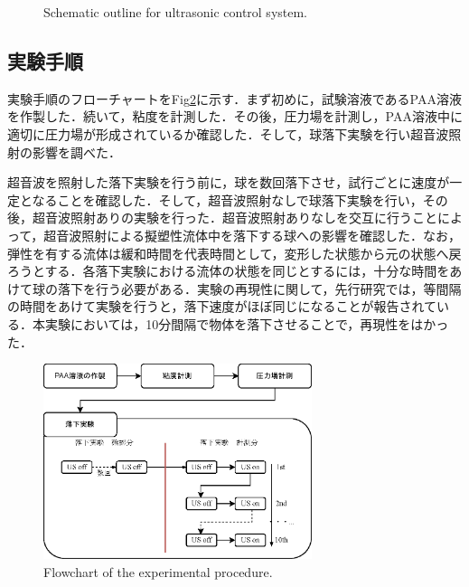 \begin{figure}[h]
    \centering
    \caption{Schematic outline for ultrasonic control system.}
    \label{fig:connect-with-signal}
\end{figure}

\newpage

\subsection{実験手順}

実験手順のフローチャートをFig\ref{fig:exp-methods}に示す．まず初めに，試験溶液であるPAA溶液を作製した．続いて，粘度を計測した．その後，圧力場を計測し，PAA溶液中に適切に圧力場が形成されているか確認した．そして，球落下実験を行い超音波照射の影響を調べた．

超音波を照射した落下実験を行う前に，球を数回落下させ，試行ごとに速度が一定となることを確認した．そして，超音波照射なしで球落下実験を行い，その後，超音波照射ありの実験を行った．超音波照射ありなしを交互に行うことによって，超音波照射による擬塑性流体中を落下する球への影響を確認した．なお，弾性を有する流体は緩和時間を代表時間として，変形した状態から元の状態へ戻ろうとする．各落下実験における流体の状態を同じとするには，十分な時間をあけて球の落下を行う必要がある．実験の再現性に関して，先行研究\cite{ref:8-5}では，等間隔の時間をあけて実験を行うと，落下速度がほぼ同じになることが報告されている．本実験においては，10分間隔で物体を落下させることで，再現性をはかった．

\begin{figure}[ht]
    \centering
    \includegraphics[width=0.7\textwidth]{2-Methods/exp-methods.eps}
    \caption{Flowchart of the experimental procedure.}
    \label{fig:exp-methods}
\end{figure}
